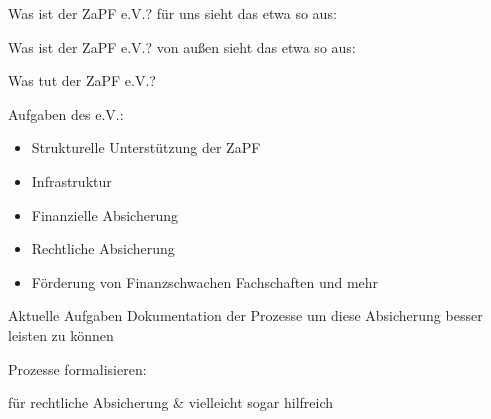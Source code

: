 \documentclass[compress, aspectratio=169]{beamer}
\begin{document}
\thispagestyle{empty}
\begin{frame}{Was ist der ZaPF e.V.?}
für uns sieht das etwa so aus: \\
  \begin{center}
  \end{center}
\end{frame}

\thispagestyle{empty}
\begin{frame}{Was ist der ZaPF e.V.?}
von außen sieht das etwa so aus: \\
  \begin{center}
  \end{center}
\end{frame}

\pagestyle{empty}
\begin{frame}{Was tut der ZaPF e.V.?}
\begin{block}{Aufgaben des e.V.:}
\begin{itemize}
\item Strukturelle Unterstützung der ZaPF
\item Infrastruktur
\item Finanzielle Absicherung
\item Rechtliche Absicherung
\item Förderung von Finanzschwachen Fachschaften und mehr
\end{itemize}
\end{block}
\pause
\begin{block}{Aktuelle Aufgaben}
Dokumentation der Prozesse um diese Absicherung besser leisten zu können
\end{block}
\end{frame}

\thispagestyle{empty}
\begin{frame}{Prozesse formalisieren:}
  \begin{center}
  \end{center}
    für rechtliche Absicherung \& vielleicht sogar hilfreich
\end{frame}
\end{document}
